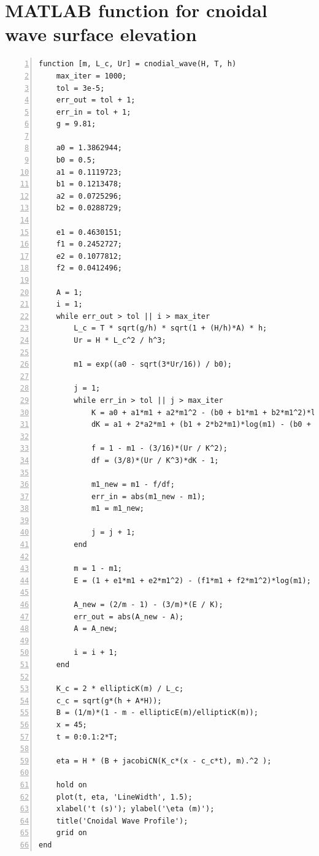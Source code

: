 \documentclass[a4paper]{article}
\begin{document}
\section*{\small MATLAB function for cnoidal wave surface elevation}
\begin{lstlisting}[frame=single, numbers=left, style=Matlab-Pyglike]
function [m, L_c, Ur] = cnodial_wave(H, T, h)
    max_iter = 1000;
    tol = 3e-5;
    err_out = tol + 1;
    err_in = tol + 1;
    g = 9.81;

    a0 = 1.3862944;
    b0 = 0.5;
    a1 = 0.1119723;
    b1 = 0.1213478;
    a2 = 0.0725296;
    b2 = 0.0288729;

    e1 = 0.4630151;
    f1 = 0.2452727;
    e2 = 0.1077812;
    f2 = 0.0412496;

    A = 1;
    i = 1;
    while err_out > tol || i > max_iter
        L_c = T * sqrt(g/h) * sqrt(1 + (H/h)*A) * h;
        Ur = H * L_c^2 / h^3;
        
        m1 = exp((a0 - sqrt(3*Ur/16)) / b0);
    
        j = 1;
        while err_in > tol || j > max_iter
            K = a0 + a1*m1 + a2*m1^2 - (b0 + b1*m1 + b2*m1^2)*log(m1);
            dK = a1 + 2*a2*m1 + (b1 + 2*b2*m1)*log(m1) - (b0 + b1*m1 + b2*m1^2)/m1;
            
            f = 1 - m1 - (3/16)*(Ur / K^2);
            df = (3/8)*(Ur / K^3)*dK - 1;
    
            m1_new = m1 - f/df;
            err_in = abs(m1_new - m1);
            m1 = m1_new;
    
            j = j + 1;
        end

        m = 1 - m1;
        E = (1 + e1*m1 + e2*m1^2) - (f1*m1 + f2*m1^2)*log(m1);
        
        A_new = (2/m - 1) - (3/m)*(E / K);
        err_out = abs(A_new - A);
        A = A_new;

        i = i + 1;
    end

    K_c = 2 * ellipticK(m) / L_c;  
    c_c = sqrt(g*(h + A*H));
    B = (1/m)*(1 - m - ellipticE(m)/ellipticK(m));
    x = 45;  
    t = 0:0.1:2*T;  

    eta = H * (B + jacobiCN(K_c*(x - c_c*t), m).^2 );
    
    hold on
    plot(t, eta, 'LineWidth', 1.5);
    xlabel('t (s)'); ylabel('\eta (m)');
    title('Cnoidal Wave Profile');
    grid on
end
\end{lstlisting}
\end{document}

